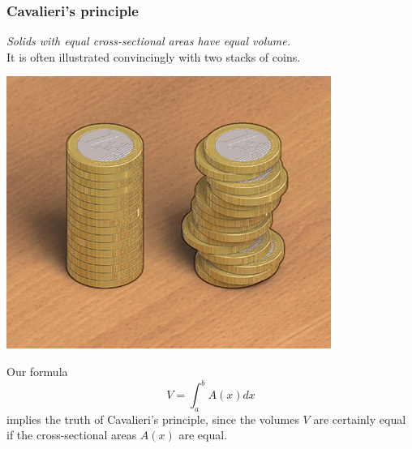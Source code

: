 \begin{frame}
\frametitle{Cavalieri's principle}
 {\it{Solids with equal cross-sectional areas have equal volume.}} \\
It is often illustrated convincingly with two stacks of coins. 

\begin{center}
{\includegraphics[width=.3\textheight]{volumes/pictures/v1}}
\end{center}

 Our formula 
\[
V=\int_a^bA(x)dx
\]
implies the truth of Cavalieri's principle, since the volumes $V$ are certainly 
equal if the cross-sectional areas $A(x)$ are equal.

\end{frame}


